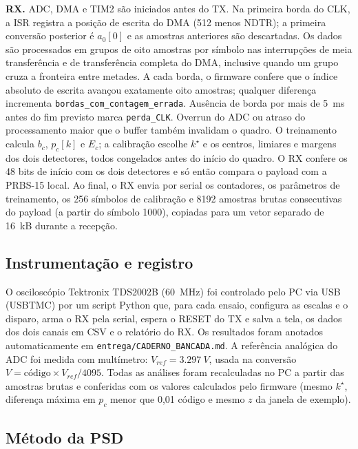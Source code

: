 \documentclass[12pt,a4paper]{article}
\begin{document}
\textbf{RX.} ADC, DMA e TIM2 são iniciados antes do TX. Na primeira borda do CLK, a ISR registra a
posição de escrita do DMA (512 menos NDTR); a primeira conversão posterior é $a_0[0]$ e as amostras
anteriores são descartadas. Os dados são processados em grupos de oito amostras por símbolo nas
interrupções de meia transferência e de transferência completa do DMA, inclusive quando um grupo
cruza a fronteira entre metades. A cada borda, o firmware confere que o índice absoluto de escrita
avançou exatamente oito amostras; qualquer diferença incrementa \texttt{bordas\_com\_contagem\_errada}.
Ausência de borda por mais de \SI{5}{ms} antes do fim previsto marca \texttt{perda\_CLK}.
Overrun do ADC ou atraso do processamento maior que o buffer também invalidam o quadro.
O treinamento calcula $b_c$, $p_c[k]$ e $E_c$; a calibração escolhe $k^\star$ e os centros, limiares e
margens dos dois detectores, todos congelados antes do início do quadro. O RX confere os 48 bits de
início com os dois detectores e só então compara o payload com a PRBS-15 local.
Ao final, o RX envia por serial os contadores, os parâmetros de treinamento, os 256 símbolos de
calibração e \num{8192} amostras brutas consecutivas do payload (a partir do símbolo \num{1000}),
copiadas para um vetor separado de \SI{16}{kB} durante a recepção.

\subsection{Instrumentação e registro}

O osciloscópio Tektronix TDS2002B (\SI{60}{MHz}) foi controlado pelo PC via USB (USBTMC) por um
script Python que, para cada ensaio, configura as escalas e o disparo, arma o RX pela serial, espera
o RESET do TX e salva a tela, os dados dos dois canais em CSV e o relatório do RX. Os resultados
foram anotados automaticamente em \nolinkurl{entrega/CADERNO_BANCADA.md}. A referência analógica do
ADC foi medida com multímetro: $V_{ref} = \SI{3,297}{V}$, usada na conversão
$V = \text{código}\times V_{ref}/4095$. Todas as análises foram recalculadas no PC a partir das
amostras brutas e conferidas com os valores calculados pelo firmware (mesmo $k^\star$, diferença
máxima em $p_c$ menor que 0,01 código e mesmo $z$ da janela de exemplo).

\subsection{Método da PSD}
\label{sec:metpsd}
\end{document}

